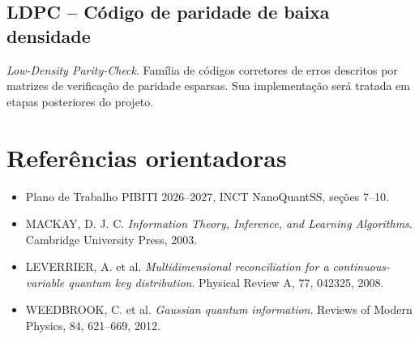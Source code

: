 \documentclass[12pt,openright,oneside,a4paper,english,brazil]{abntex2}
\begin{document}
\section{LDPC -- Código de paridade de baixa densidade}
\textit{Low-Density Parity-Check}. Família de códigos corretores de erros descritos por matrizes de verificação de paridade esparsas. Sua implementação será tratada em etapas posteriores do projeto.

\chapter{Referências orientadoras}
\begin{itemize}
\item Plano de Trabalho PIBITI 2026--2027, INCT NanoQuantSS, seções 7--10.
\item MACKAY, D. J. C. \textit{Information Theory, Inference, and Learning Algorithms}. Cambridge University Press, 2003.
\item LEVERRIER, A. et al. \textit{Multidimensional reconciliation for a continuous-variable quantum key distribution}. Physical Review A, 77, 042325, 2008.
\item WEEDBROOK, C. et al. \textit{Gaussian quantum information}. Reviews of Modern Physics, 84, 621--669, 2012.
\end{itemize}
\end{document}
